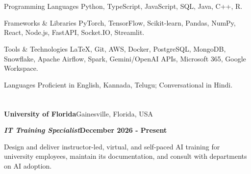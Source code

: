 \documentclass[10pt, letterpaper]{article}
\renewenvironment{leadershipentry}[2]{%
    \vspace{\entrySpacing}
    \needspace{4\baselineskip}%
    \noindent\textbf{#1}\hfill #2\par
}{}
\renewenvironment{positionentry}[2]{%
    \vspace{\highlightSpacing}
    \noindent\textbf{\textit{#1}}\hfill \textbf{#2}\par
    \vspace{\highlightSpacing}
    \begin{highlightsforbulletentries}
}{%
    \end{highlightsforbulletentries}
}
\begin{document}
\section{}

\vspace{\entrySpacing}
\begin{skillcategory}{Programming Languages}
	Python, TypeScript, JavaScript, SQL, Java, C++, R.
\end{skillcategory}

\vspace{\entrySpacing}
\begin{skillcategory}{Frameworks \& Libraries}
	PyTorch, TensorFlow, Scikit-learn, Pandas, NumPy, React, Node.js, FastAPI, Socket.IO, Streamlit.
\end{skillcategory}

\vspace{\entrySpacing}
\begin{skillcategory}{Tools \& Technologies}
	LaTeX, Git, AWS, Docker, PostgreSQL, MongoDB, Snowflake, Apache Airflow, Spark, Gemini/OpenAI APIs, Microsoft 365, Google Workspace.
\end{skillcategory}

\vspace{\entrySpacing}
\begin{skillcategory}{Languages}
	Proficient in English, Kannada, Telugu; Conversational in Hindi.
\end{skillcategory}

\vspace{\headerSpacing}


\section{}

\vspace{\entrySpacing}
\begin{leadershipentry}{University of Florida}{Gainesville, Florida, USA}
	\begin{positionentry}{IT Training Specialist}{December 2026 - Present}
		\item Design and deliver instructor-led, virtual, and self-paced AI training for university employees, maintain its documentation, and consult with departments on AI adoption.
	\end{positionentry}
\end{leadershipentry}
\end{document}
